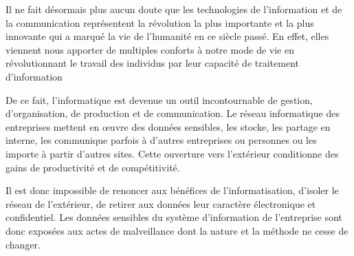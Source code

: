 

Il ne fait désormais plus aucun doute que les technologies de l'information et de la communication représentent 
la révolution la plus importante et la plus innovante qui a marqué la vie de l'humanité en ce siècle passé. 
En effet, elles viennent nous apporter de multiples conforts à notre mode de vie en révolutionnant le 
travail des individus par leur capacité de traitement d'information

De ce fait, l'informatique est devenue un outil incontournable de gestion, d'organisation, de production et de communication. Le réseau informatique des entreprises mettent en œuvre des données sensibles, les stocke, les partage en interne, les communique parfois à d'autres entreprises ou personnes ou les importe à partir d'autres sites. Cette ouverture vers l'extérieur conditionne des gains de productivité et de compétitivité.

Il est donc impossible de renoncer aux bénéfices de l'informatisation, d'isoler le réseau de l'extérieur, de retirer aux données leur caractère électronique et confidentiel. Les données sensibles du système d'information de l'entreprise sont donc exposées aux actes de malveillance dont la nature et la méthode ne cesse de changer. %


